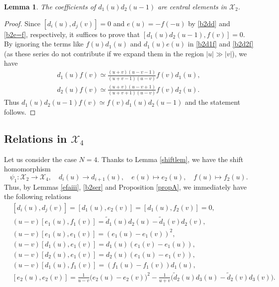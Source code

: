 \documentclass[11pt,reqno]{amsart}
\numberwithin{equation}{section}
\newtheorem{lem}[thm]{Lemma}
\theoremstyle{definition}
\theoremstyle{remark}
\newcommand{\tl}{\tilde}
\newcommand{\scrX}{{\mathscr{X}}}
\begin{document}
\begin{lem}\label{centralb2}
The coefficients of $d_1(u)d_2(u-1)$ are central elements in $\scrX_2$.
\end{lem}
\begin{proof}
Since $[d_i(u),d_j(v)]=0$ and $e(u)=-f(-u)$ by \eqref{b2dd} and \eqref{b2e=f}, respectively, it suffices to prove that $[d_1(u)d_2(u-1),f(v)]=0$. By ignoring the terms like $f(u)d_1(u)$ and $d_1(u)e(u)$ in \eqref{b2d1f} and \eqref{b2d2f} (as these series do not contribute if we expand them in the region $|u|\gg |v|$), we have
\begin{align*}
d_1(u)f(v)\simeq \frac{(u+v)(u-v-1)}{(u+v-1)(u-v)}f(v)d_1(u),\\
d_2(u)f(v)\simeq \frac{(u+v)(u-v+1)}{(u+v+1)(u-v)}f(v)d_2(u).
\end{align*}
Thus $d_1(u)d_2(u-1)f(v)\simeq f(v)d_1(u)d_2(u-1)$ and the statement follows.
\end{proof}

\subsection{Relations in $\scrX_4$}\label{secN=4}
Let us consider the case $N=4$. Thanks to Lemma \ref{shiftlem}, we have the shift homomorphism
\[
 \psi_1:  \scrX_2\to \scrX_4,\quad d_{i}(u)\to d_{i+1}(u),\quad e(u)\mapsto e_{2}(u),\quad f(u)\mapsto f_{2}(u).
\]
Thus, by Lemmas \ref{efaiii}, \ref{b2ser} and Proposition \ref{propA}, we immediately have the following relations
\begin{align}
&[d_i(u),d_j(v)]=[d_1(u),e_2(v)]=[d_1(u),f_2(v)]=0,\label{ddb4}\\
&(u-v)[e_1(u),f_1(v)]=\tl d_1(u)d_2(u)-\tl d_1(v)d_2(v),\label{e1f1b4}\\
&(u-v)[e_1(u),e_1(v)]=(e_1(u)-e_1(v))^2,\label{e1e1b4}\\
&(u-v)[d_1(u),e_1(v)]=d_1(u)(e_1(v)-e_1(u)),\label{d1e1b4}\\
&(u-v)[d_2(u),e_1(v)]=d_2(u)(e_1(u)-e_1(v)),\label{d2e1b4}\\
&(u-v)[d_1(u),f_1(v)]=(f_1(u)-f_1(v))d_1(u),\label{d1f1b4}\\
&[e_2(u),e_2(v)]=\frac{1}{u-v}\big(e_2(u)-e_2(v)\big)^2-\frac{1}{u+v}\big(\tl d_2(u)d_3(u)-\tl d_2(v)d_3(v)\big).\label{e2e2b4}
\end{align}
\end{document}
